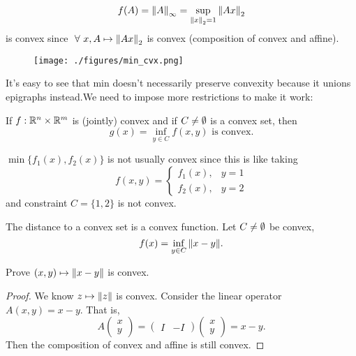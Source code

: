\documentclass[class=article,crop=false]{standalone}
\begin{document}
\begin{eg}
	\[ f(A) = {\left\lVert{ A}\right\rVert}_{\infty} = \sup_{{\left\lVert{ x}\right\rVert}_2=1 } {\left\lVert{ Ax}\right\rVert}_2 \] is convex since $ \ \forall \ x, A \mapsto {\left\lVert{ Ax}\right\rVert}_2 $ is convex (composition of convex and affine).
\end{eg}

\begin{figure}[H]
	\centering
	\texttt{[image: ./figures/min\_cvx.png]}
\end{figure}
It's easy to see that min doesn't necessarily preserve convexity because it unions epigraphs instead.We need to impose more restrictions to make it work:
\begin{thm}
	If $ f: \mathbb{R}^{n} \times \mathbb{R}^{m}$ is (jointly) convex and if $ C \neq \emptyset$ is a convex set, then
	\[
		g(x) = \inf_{y \in C} f(x,y) \text{ is convex} 
	.\] 
\end{thm}

\begin{eg}
	$ \min \{f_1(x), f_2(x)\} $ is not usually convex since this is like taking
	\begin{equation*}
		f(x,y)=
	\begin{cases}
		f_1(x), &y=1\\
		f_2(x), &y=2
	\end{cases}
	\end{equation*}
	and constraint $ C = \{1,2\} $ is not convex.
\end{eg}
\begin{eg}
The distance to a convex set is a convex function. Let $ C \neq \emptyset$ be convex,
\[
	f(x) = \inf_{y \in C} {\left\lVert{ x-y}\right\rVert} 
.\] 
	
Prove $ (x,y) \mapsto {\left\lVert{ x-y}\right\rVert} $ is convex.
\begin{proof}
	We know $ z \mapsto {\left\lVert{ z}\right\rVert} $ is convex. Consider the linear operator $ A(x,y) = x-y$. That is,
	 \[
		 A \begin{pmatrix} x\\y \end{pmatrix} = \begin{pmatrix} I & -I \end{pmatrix} \begin{pmatrix} x\\y \end{pmatrix} = x-y
	.\] 
	Then the composition of convex and affine is still convex.
\end{proof}
\end{eg}
\end{document}
